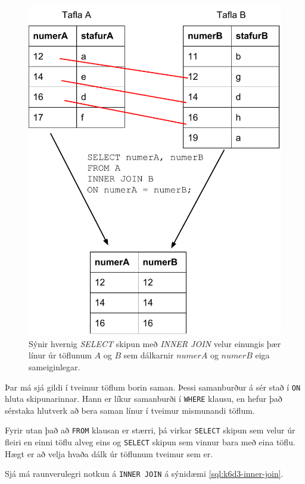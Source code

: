 \begin{figure}
\caption[INNER JOIN]{Sýnir hvernig \emph{SELECT} skipun með \emph{INNER JOIN} velur einungis þær línur úr töflunum $A$ og $B$ sem dálkarnir $numerA$ og $numerB$ eiga sameiginlegar.}
\label{mynd:inner-join}
\centering
\includegraphics[width=\linewidth]{myndir/inner-join}
\end{figure}

Þar má sjá gildi í tveimur töflum borin saman. Þessi samanburður á sér stað í \verb|ON| hluta skipunarinnar. Hann er líkur samanburði í \verb|WHERE| klausu, en hefur það sérstaka hlutverk að bera saman línur í tveimur mismunandi töflum.

Fyrir utan það að \verb|FROM| klausan er stærri, þá virkar \verb|SELECT| skipun sem velur úr fleiri en einni töflu alveg eins og \verb|SELECT| skipun sem vinnur bara með eina töflu. Hægt er að velja hvaða dálk úr töflunum tveimur sem er.

Sjá má raunverulegri notkun á \verb|INNER JOIN| á sýnidæmi \ref{sql:k6d3-inner-join}.

